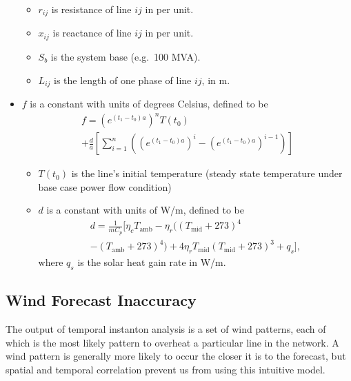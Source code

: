 \documentclass[journal,twoside]{IEEEtran}
\begin{document}
\begin{itemize}
  \begin{itemize}
  \itemsep1pt\parskip0pt
  \item
    $r_{ij}$ is resistance of line $ij$ in per unit.
  \item
    $x_{ij}$ is reactance of line $ij$ in per unit.
  \item
    $S_b$ is the system base (e.g.~100 MVA).
  \item
    $L_{ij}$ is the length of one phase of line $ij$, in m.
  \end{itemize}
\item $f$ is a constant with units of degrees Celsius, defined to be
	\begin{multline*}
		f = (e^{(t_1 - t_0)a})^n T(t_0) \\ + \frac{d}{a}\left[ \sum_{i=1}^n \left( (e^{(t_1-t_0)a})^i - (e^{(t_1-t_0)a})^{i-1} \right)\right]
	\end{multline*}
  \begin{itemize}
  \itemsep1pt\parskip0pt
  \item
    $T(t_0)$ is the line's initial temperature (steady state temperature
    under base case power flow condition)
  \item $d$ is a constant with units of W/m, defined to be 
  	\begin{multline*}
  	d = \frac{1}{mC_p}\big[ \eta_cT_\text{amb} - \eta_r\big((T_\text{mid} + 273)^4 \\ - (T_\text{amb} + 273)^4\big) + 4\eta_rT_\text{mid}(T_\text{mid} + 273)^3 + q_s \big],
  	\end{multline*}
      where $q_s$ is the solar heat gain rate in W/m.
  \end{itemize}
\end{itemize}

\subsection{Wind Forecast Inaccuracy}\label{sec:models-wind}
The output of temporal instanton analysis is a set of wind patterns, each of which is the most likely pattern to overheat a particular line in the network. A wind pattern is generally more likely to occur the closer it is to the forecast, but spatial and temporal correlation prevent us from using this intuitive model.
\end{document}
